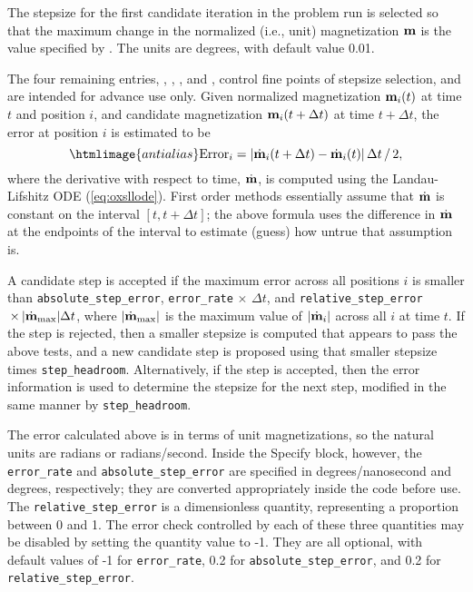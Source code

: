 \begin{description}
The stepsize for the first candidate iteration in the problem run is
selected so that the maximum change in the normalized (i.e., unit)
magnetization $\textbf{m}$ is the value specified by .  The
units are degrees, with default value 0.01.

The four remaining entries, ,
, , and
, control fine points of stepsize selection,
and are intended for advance use only.  Given normalized magnetization
$\textbf{m}_i(t)$ at time $t$ and position $i$, and candidate magnetization
$\textbf{m}_i(t+\Delta t)$ at time $t+\Delta t$, the error at position $i$ is
estimated to be
\begin{displaymath}
\htmlimage{antialias}
\mbox{Error}_i =
  \left|\dot{\vm}_i(t+\Delta t) - \dot{\vm}_i(t)\right|\Delta t
      \,/\,2,
\end{displaymath}
where the derivative with respect to time, $\dot{\textbf{m}}$, is computed
using the Landau-Lifshitz ODE (\ref{eq:oxsllode}).  First order methods
essentially assume that $\dot{\textbf{m}}$ is constant on the interval
$[t,t+\Delta t]$; the above formula uses the difference in $\dot{\textbf{m}}$
at the endpoints of the interval to estimate (guess) how untrue that
assumption is.

A candidate step is accepted if the maximum error across all positions
$i$ is smaller than \texttt{absolute\_step\_error},
\texttt{error\_rate}$\,\times\,\Delta t$, and
\texttt{relative\_step\_error}$\,\times\,|\dot{\textbf{m}}_{\rm
max}|\Delta t$, where $|\dot{\textbf{m}}_{\rm max}|$ is the maximum value of
$|\dot{\textbf{m}}_i|$ across all $i$ at time $t$.  If the step is rejected,
then a smaller stepsize is computed that appears to pass the above
tests, and a new candidate step is proposed using that smaller stepsize
times \texttt{step\_headroom}.  Alternatively, if the step is accepted,
then the error information is used to determine the stepsize for the
next step, modified in the same manner by \texttt{step\_headroom}.

The error calculated above is in terms of unit magnetizations, so the
natural units are radians or radians/second.  Inside the Specify block,
however, the \texttt{error\_rate} and \texttt{absolute\_step\_error} are
specified in degrees/nanosecond and degrees, respectively; they are
converted appropriately inside the code before use.  The
\texttt{relative\_step\_error} is a dimensionless quantity, representing a
proportion between 0 and 1.  The error check controlled by each of these
three quantities may be disabled by setting the quantity value to -1.
They are all optional, with default values of -1 for \texttt{error\_rate},
0.2 for \texttt{absolute\_step\_error}, and 0.2 for
\texttt{relative\_step\_error}.


\end{description}
